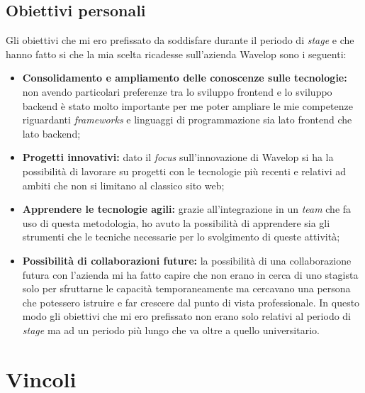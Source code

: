 \subsection{Obiettivi personali}
Gli obiettivi che mi ero prefissato da soddisfare durante il periodo di \emph{stage} e che hanno fatto si che la mia scelta ricadesse sull'azienda Wavelop sono i seguenti:
\begin{itemize}
  \item \textbf{Consolidamento e ampliamento delle conoscenze sulle tecnologie:} non avendo particolari preferenze tra lo sviluppo \gls{frontend} e lo sviluppo \gls{backend} è stato molto importante per me poter ampliare le mie competenze riguardanti \emph{frameworks} e linguaggi di programmazione sia lato \gls{frontend} che lato \gls{backend};
  \item \textbf{Progetti innovativi:} dato il \emph{focus} sull'innovazione di Wavelop si ha la possibilità di lavorare su progetti con le tecnologie più recenti e relativi ad ambiti che non si limitano al classico sito web;
  \item \textbf{Apprendere le tecnologie agili:} grazie all'integrazione in un \emph{team} che fa uso di questa metodologia, ho avuto la possibilità di apprendere sia gli strumenti che le tecniche necessarie per lo svolgimento di queste attività;
  \item \textbf{Possibilità di collaborazioni future:} la possibilità di una collaborazione futura con l'azienda mi ha fatto capire che non erano in cerca di uno stagista solo per sfruttarne le capacità temporaneamente ma cercavano una persona che potessero istruire e far crescere dal punto di vista professionale. In questo modo gli obiettivi che mi ero prefissato non erano solo relativi al periodo di \emph{stage} ma ad un periodo più lungo che va oltre a quello universitario.
\end{itemize}

\section{Vincoli}

